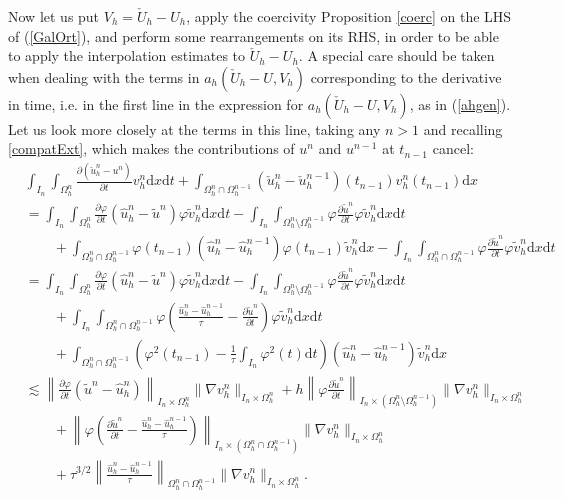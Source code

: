\documentclass[11pt,a4paper]{article}
\theoremstyle{plain}
\theoremstyle{definition}
\theoremstyle{remark}
\numberwithin{equation}{section}
\newcommand{\dx}{\mathrm{d}x}
\newcommand{\dt}{\mathrm{d}t}
\begin{document}
Now let us put $V_h = \check{U}_h - U_h$, apply the coercivity Proposition \ref{coerc} on the LHS of (\ref{GalOrt}), and perform some rearrangements on its RHS, in order to be able to apply the interpolation estimates to $\check{U}_h   - U_h$. A special care
should be taken when dealing with the terms in $a_h (\check{U}_h - U, V_h)$ corresponding to the derivative in time, i.e. in the first line in the expression for $a_h (\check{U}_h - U, V_h)$, as in (\ref{ahgen}). Let us look more closely at the terms in this line, taking any $n > 1$ {and recalling \eqref{compatExt}, which makes the contributions of $u^n$ and $u^{n-1}$ at $t_{n-1}$ cancel}:
{\begin{align*} &\int_{I_n} \int_{\Omega_h^n}  \frac{\partial (\check{u}^n_h -
	u^n)}{\partial t} v_h^n \dx \dt + \int_{\Omega_h^n \cap
	\Omega_h^{n - 1}} (\check{u}^n_h - \check{u}^{n - 1}_h)  (t_{n - 1}) v^n_h
(t_{n - 1}) \dx \\
 &= \int_{I_n} \int_{\Omega_h^n}  \frac{\partial \varphi}{\partial t}
(\hat{u}_h^n - \tilde{u}^n) \varphi \tilde{v}_h^n \dx \dt -
\int_{I_n} \int_{\Omega_h^n \setminus \Omega_h^{n - 1}} \varphi \frac{\partial
	\tilde{u}^n}{\partial t} \varphi \tilde{v}^n_h \dx \dt \\
 & \qquad + \int_{\Omega_h^n \cap \Omega_h^{n - 1}} \varphi(t_{n-1}) (\hat{u}_h^n  - \hat{u}_h^{n - 1}) \varphi(t_{n-1}) \tilde{v}_h^n \dx  -
\int_{I_n} \int_{\Omega_h^n \cap \Omega_h^{n - 1}} \varphi \frac{\partial
	\tilde{u}^n}{\partial t} \varphi \tilde{v}^n_h \dx \dt \\
 &= \int_{I_n} \int_{\Omega_h^n}  \frac{\partial \varphi}{\partial t}
(\hat{u}_h^n - \tilde{u}^n) \varphi \tilde{v}_h^n \dx \dt -
\int_{I_n} \int_{\Omega_h^n \setminus \Omega_h^{n - 1}} \varphi \frac{\partial
	\tilde{u}^n}{\partial t} \varphi \tilde{v}^n_h \dx \dt \\
 & \qquad + \int_{I_n} \int_{\Omega_h^n \cap \Omega_h^{n - 1}} \varphi \left(
\frac{{\hat{u}_h^n}  - \hat{u}_h^{n - 1}}{\tau} - \frac{\partial
	\tilde{u}^n}{\partial t} \right) \varphi  \tilde{v}^n_h \dx
\dt \\
 & \qquad + \int_{\Omega_h^n \cap \Omega_h^{n - 1}} \left( \varphi^2 (t_{n - 1})
- \frac{1}{\tau} \int_{I_n}^{} \varphi^2 (t) \dt \right) \left(
{\hat{u}_h^n}  - \hat{u}_h^{n - 1} \right) \tilde{v}^n_h
\dx \\
 &\lesssim \left\| \frac{\partial \varphi}{\partial t} (\tilde{u}^n -
\hat{u}_h^n) \right\|_{I_n \times \Omega_h^n} \| \nabla v_h^n
\|_{I_n \times \Omega_h^n} + h  \left\| \varphi \frac{\partial
	\tilde{u}^n}{\partial t} \right\|_{I_n \times (\Omega_h^n \setminus
	\Omega_h^{n - 1})} \| \nabla v_h^n \|_{I_n \times \Omega_h^n} \\
 & \qquad + \left\| \varphi \left( \frac{\partial \tilde{u}^n}{\partial t} -
\frac{{\hat{u}_h^n}  - \hat{u}_h^{n - 1}}{\tau} \right)  \right\|
_{I_n \times (\Omega_h^n \cap \Omega_h^{n - 1})} \| \nabla v_h^n
\|_{I_n \times \Omega_h^n} \\
 & \qquad + \tau^{3 / 2} \left\| \frac{{\hat{u}_h^n}
	- \hat{u}_h^{n - 1}}{\tau} \right\|_{\Omega_h^n \cap \Omega_h^{n -
		1}} \| \nabla v_h^n \|_{I_n \times \Omega_h^n} .
\end{align*}}
\end{document}
